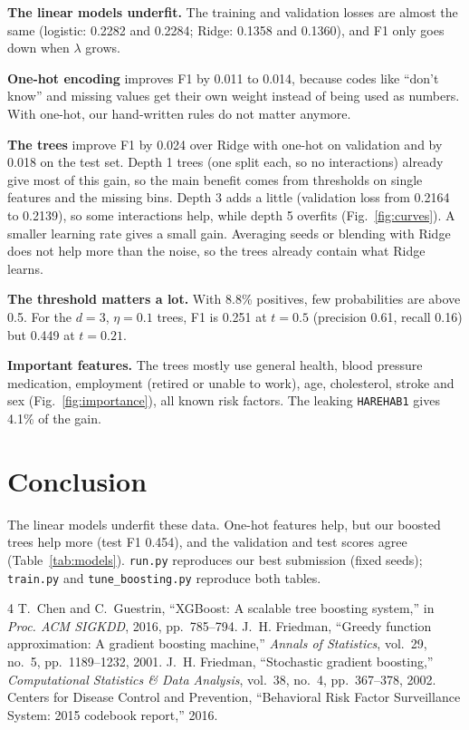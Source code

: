 \documentclass[10pt,conference,compsocconf]{IEEEtran}
\begin{document}
\textbf{The linear models underfit.} The training and validation losses are
almost the same (logistic: 0.2282 and 0.2284; Ridge: 0.1358 and 0.1360), and
F1 only goes down when $\lambda$ grows.

\textbf{One-hot encoding} improves F1 by 0.011 to 0.014, because codes like
``don't know'' and missing values get their own weight instead of being used
as numbers. With one-hot, our hand-written rules do not matter anymore.

\textbf{The trees} improve F1 by 0.024 over Ridge with one-hot on validation
and by 0.018 on the test set. Depth 1 trees (one split each, so no
interactions) already give most of this gain, so the main benefit comes from
thresholds on single features and the missing bins. Depth 3 adds a little
(validation loss from 0.2164 to 0.2139), so some interactions help, while
depth 5 overfits (Fig.~\ref{fig:curves}). A smaller learning rate gives a
small gain. Averaging seeds or blending with Ridge does not help more than
the noise, so the trees already contain what Ridge learns.

\textbf{The threshold matters a lot.} With 8.8\% positives, few
probabilities are above 0.5. For the $d=3$, $\eta=0.1$ trees, F1 is 0.251 at
$t=0.5$ (precision 0.61, recall 0.16) but 0.449 at $t=0.21$.

\textbf{Important features.} The trees mostly use general health, blood
pressure medication, employment (retired or unable to work), age,
cholesterol, stroke and sex (Fig.~\ref{fig:importance}), all known risk
factors. The leaking \texttt{HAREHAB1} gives 4.1\% of the gain.

\section{Conclusion}
The linear models underfit these data. One-hot features help, but our
boosted trees help more (test F1 0.454), and the validation and test scores
agree (Table~\ref{tab:models}). \texttt{run.py} reproduces our best
submission (fixed seeds); \texttt{train.py} and
\texttt{tune\_boosting.py} reproduce both tables.

\begin{thebibliography}{4}
 T.~Chen and C.~Guestrin, ``XGBoost: A scalable tree boosting
system,'' in \emph{Proc. ACM SIGKDD}, 2016, pp.~785--794.
 J.~H. Friedman, ``Greedy function approximation: A gradient
boosting machine,'' \emph{Annals of Statistics}, vol.~29, no.~5,
pp.~1189--1232, 2001.
 J.~H. Friedman, ``Stochastic gradient boosting,''
\emph{Computational Statistics \& Data Analysis}, vol.~38, no.~4,
pp.~367--378, 2002.
 Centers for Disease Control and Prevention, ``Behavioral Risk
Factor Surveillance System: 2015 codebook report,'' 2016.
\end{thebibliography}
\end{document}
